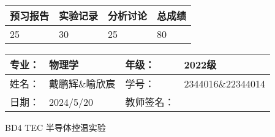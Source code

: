 \documentclass[dvipsnames, svgnames,a4paper,11pt]{article}
\begin{document}
\begin{table}
	\renewcommand\arraystretch{1.7}
	\begin{tabularx}{\textwidth}{
		|X|X|X|X
		|X|X|X|X|}
	\hline
	\multicolumn{2}{|c|}{预习报告}&\multicolumn{2}{|c|}{实验记录}&\multicolumn{2}{|c|}{分析讨论}&\multicolumn{2}{|c|}{总成绩}\\
	\hline
	\LARGE25 & & \LARGE30 & & \LARGE25 & & \LARGE80 & \\
	\hline
	\end{tabularx}
\end{table}


\begin{table}
	\renewcommand\arraystretch{1.7}
	\begin{tabularx}{\textwidth}{|X|X|X|X|}
	\hline
	专业：& 物理学 &年级：& 2022级\\
	\hline
	姓名：& 戴鹏辉\&喻欣宸  & 学号： & 2344016\&22344014 \\
	\hline
	日期：& 2024/5/20 & 教师签名：& \\
	\hline
	\end{tabularx}
\end{table}

\begin{center}
	\LARGE BD4  \quad TEC 半导体控温实验
\end{center}
\end{document}
